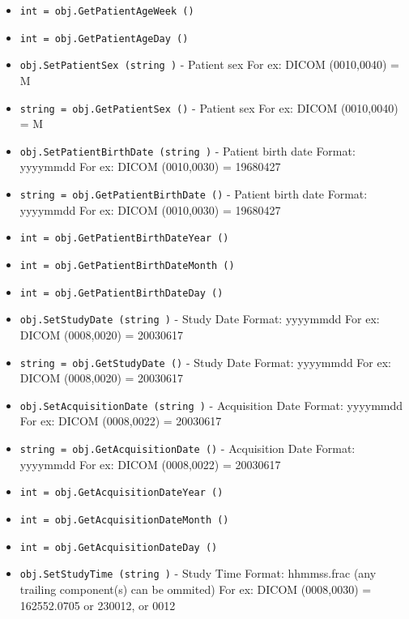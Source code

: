 \begin{itemize}
\item  \verb|int = obj.GetPatientAgeWeek ()|

\item  \verb|int = obj.GetPatientAgeDay ()|

\item  \verb|obj.SetPatientSex (string )| -  Patient sex
 For ex: DICOM (0010,0040) = M

\item  \verb|string = obj.GetPatientSex ()| -  Patient sex
 For ex: DICOM (0010,0040) = M

\item  \verb|obj.SetPatientBirthDate (string )| -  Patient birth date
 Format: yyyymmdd
 For ex: DICOM (0010,0030) = 19680427

\item  \verb|string = obj.GetPatientBirthDate ()| -  Patient birth date
 Format: yyyymmdd
 For ex: DICOM (0010,0030) = 19680427

\item  \verb|int = obj.GetPatientBirthDateYear ()|

\item  \verb|int = obj.GetPatientBirthDateMonth ()|

\item  \verb|int = obj.GetPatientBirthDateDay ()|

\item  \verb|obj.SetStudyDate (string )| -  Study Date
 Format: yyyymmdd
 For ex: DICOM (0008,0020) = 20030617

\item  \verb|string = obj.GetStudyDate ()| -  Study Date
 Format: yyyymmdd
 For ex: DICOM (0008,0020) = 20030617

\item  \verb|obj.SetAcquisitionDate (string )| -  Acquisition Date
 Format: yyyymmdd
 For ex: DICOM (0008,0022) = 20030617

\item  \verb|string = obj.GetAcquisitionDate ()| -  Acquisition Date
 Format: yyyymmdd
 For ex: DICOM (0008,0022) = 20030617

\item  \verb|int = obj.GetAcquisitionDateYear ()|

\item  \verb|int = obj.GetAcquisitionDateMonth ()|

\item  \verb|int = obj.GetAcquisitionDateDay ()|

\item  \verb|obj.SetStudyTime (string )| -  Study Time
 Format: hhmmss.frac (any trailing component(s) can be ommited)
 For ex: DICOM (0008,0030) = 162552.0705 or 230012, or 0012


\end{itemize}
